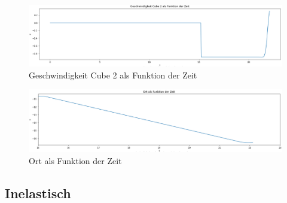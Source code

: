 \documentclass[../main.tex]{subfiles}
\begin{document}
    \begin{figure}[H]
        \begin{center}
            \centerline{\includegraphics[width=155mm]{./images/Inelastisch/GeschwindigkeitCube2AlsFunktionDerZeit}}
            \caption{Geschwindigkeit Cube 2 als Funktion der Zeit}
            \label{fig:GeschwindigkeitCube2AlsFunktionDerZeit}
        \end{center}
    \end{figure}

    \begin{figure}[H]
        \begin{center}
            \centerline{\includegraphics[width=155mm]{./images/Inelastisch/OrtAlsFunktionDerZeit}}
            \caption{Ort als Funktion der Zeit}
            \label{fig:OrtAlsFunktionDerZeitInelastisch}
        \end{center}
    \end{figure}

    \subsection{Inelastisch}
\end{document}
